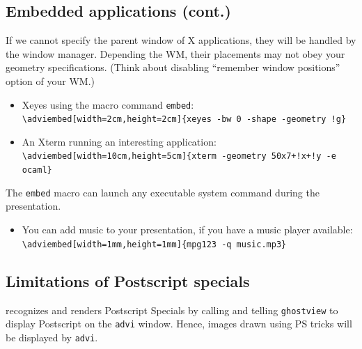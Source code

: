 \documentclass[12pt]{article}
\begin{document}
\newpage

\subsection* {Embedded applications (cont.)}

If we cannot specify the parent window of X applications,
they will be handled by the window manager.
Depending the WM, 
their placements may not obey your geometry specifications.
(Think about disabling ``remember window positions'' option of your WM.)

\begin{itemize}
 \item Xeyes using the macro command \verb|embed|:\\
   \verb|\adviembed[width=2cm,height=2cm]{xeyes -bw 0 -shape -geometry !g}|\\

 \item An Xterm running an interesting application:\\
   \verb|\adviembed[width=10cm,height=5cm]{xterm -geometry 50x7+!x+!y -e ocaml}|\\
\end{itemize}

The \verb|embed| macro can launch any executable system command during
the presentation. 
\begin{itemize}
 \item You can add music to your presentation, if you have a music
  player available:\\
  \verb|\adviembed[width=1mm,height=1mm]{mpg123 -q music.mp3}|
\end{itemize}


\newpage

\subsection* {Limitations of Postscript specials}

{\ActiveDVI} recognizes and renders Postscript Specials by calling and telling
\verb"ghostview" to display Postscript on the \verb"advi" window. 
Hence, images drawn using PS tricks will be displayed by \verb"advi". 
\end{document}
